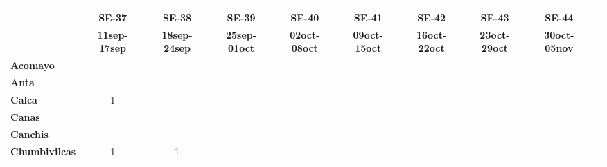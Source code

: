 \begin{tabular}{lccccccccc}
	\textbf{}              	  
	& \multicolumn{1}{l}{}                        
	& \multicolumn{1}{l}{}      
	& \multicolumn{1}{l}{}                         
	& \multicolumn{1}{l}{}                         
	& \multicolumn{1}{l}{}                         
	& \multicolumn{1}{l}{}                        
	& \multicolumn{1}{l}{}                         
	& \multicolumn{1}{l}{} \\                   
	\textbf{}  															
	&\textbf{SE-37}
	&\textbf{SE-38}
	&\textbf{SE-39}
	&\textbf{SE-40}
	&\textbf{SE-41}
	&\textbf{SE-42}
	&\textbf{SE-43}	
	&\textbf{SE-44}	\\							
	\textbf{}      							
	&\textbf{11sep-17sep}
	&\textbf{18sep-24sep} 
	&\textbf{25sep-01oct} 
	&\textbf{02oct-08oct}
	&\textbf{09oct-15oct}
	&\textbf{16oct-22oct}
	&\textbf{23oct-29oct}
	&\textbf{30oct-05nov}\\
	\textbf{Acomayo}                        												
	&\cellcolor[HTML]{FCC46C}
	&\cellcolor[HTML]{FCC46C}					
	&\cellcolor[HTML]{FCC46C}
	&\cellcolor[HTML]{FCC46C}					
	&\cellcolor[HTML]{FCC46C}
	&\cellcolor[HTML]{FCC46C} 
	&\cellcolor[HTML]{FCC46C}
	&\cellcolor[HTML]{FCC46C}\\
	\textbf{Anta}                                                  							&\cellcolor[HTML]{FCC46C}						
	&\cellcolor[HTML]{FCC46C}					
	&\cellcolor[HTML]{FCC46C}					
	&\cellcolor[HTML]{FCC46C}					
	&\cellcolor[HTML]{FCC46C}
	&\cellcolor[HTML]{FCC46C}	
	&\cellcolor[HTML]{FCC46C}
	&\cellcolor[HTML]{FCC46C}\\					
	\textbf{Calca} 												
	&1
	&\cellcolor[HTML]{FCC46C}
	&\cellcolor[HTML]{FCC46C}
	&\cellcolor[HTML]{FCC46C}
	&\cellcolor[HTML]{FCC46C}
	&\cellcolor[HTML]{FCC46C}
	&\cellcolor[HTML]{FCC46C}
	&\cellcolor[HTML]{FCC46C}\\          			
	\textbf{Canas}     			
	&\cellcolor[HTML]{FCC46C}					
	&\cellcolor[HTML]{FCC46C}
	&\cellcolor[HTML]{FCC46C}	
	&\cellcolor[HTML]{FCC46C}
	&\cellcolor[HTML]{FCC46C}
	&\cellcolor[HTML]{FCC46C}
	&\cellcolor[HTML]{FCC46C}
	&\cellcolor[HTML]{FCC46C}\\	
	\textbf{Canchis}   							
	&\cellcolor[HTML]{FCC46C}
	&\cellcolor[HTML]{FCC46C}
	&\cellcolor[HTML]{FCC46C}
	&\cellcolor[HTML]{FCC46C}
	&\cellcolor[HTML]{FCC46C}
	&\cellcolor[HTML]{FCC46C}
	&\cellcolor[HTML]{FCC46C}
	&\cellcolor[HTML]{FCC46C}\\											
	\textbf{Chumbivilcas}                      												
	&1
	&1
	&\cellcolor[HTML]{FCC46C}

\end{tabular}
